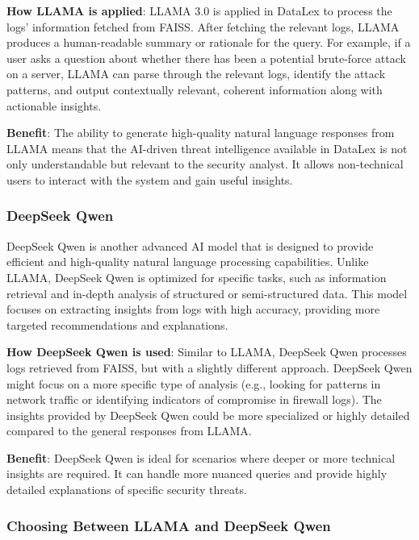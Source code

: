 \textbf{How LLAMA is applied}: LLAMA 3.0 is applied in DataLex to process the logs' information fetched from FAISS. After fetching the relevant logs, LLAMA produces a human-readable summary or rationale for the query. For example, if a user asks a question about whether there has been a potential brute-force attack on a server, LLAMA can parse through the relevant logs, identify the attack patterns, and output contextually relevant, coherent information along with actionable insights.

\textbf{Benefit}: The ability to generate high-quality natural language responses from LLAMA means that the AI-driven threat intelligence available in DataLex is not only understandable but relevant to the security analyst. It allows non-technical users to interact with the system and gain useful insights.

\subsubsection{DeepSeek Qwen}
\label{subsubsec_deepseek_qwen}

DeepSeek Qwen is another advanced AI model that is designed to provide efficient and high-quality natural language processing capabilities. Unlike LLAMA, DeepSeek Qwen is optimized for specific tasks, such as information retrieval and in-depth analysis of structured or semi-structured data. This model focuses on extracting insights from logs with high accuracy, providing more targeted recommendations and explanations.

\textbf{How DeepSeek Qwen is used}: Similar to LLAMA, DeepSeek Qwen processes logs retrieved from FAISS, but with a slightly different approach. DeepSeek Qwen might focus on a more specific type of analysis (e.g., looking for patterns in network traffic or identifying indicators of compromise in firewall logs). The insights provided by DeepSeek Qwen could be more specialized or highly detailed compared to the general responses from LLAMA.

\textbf{Benefit}: DeepSeek Qwen is ideal for scenarios where deeper or more technical insights are required. It can handle more nuanced queries and provide highly detailed explanations of specific security threats.

\subsubsection{Choosing Between LLAMA and DeepSeek Qwen}
\label{subsubsec_choosing_llama_or_deepseek}

